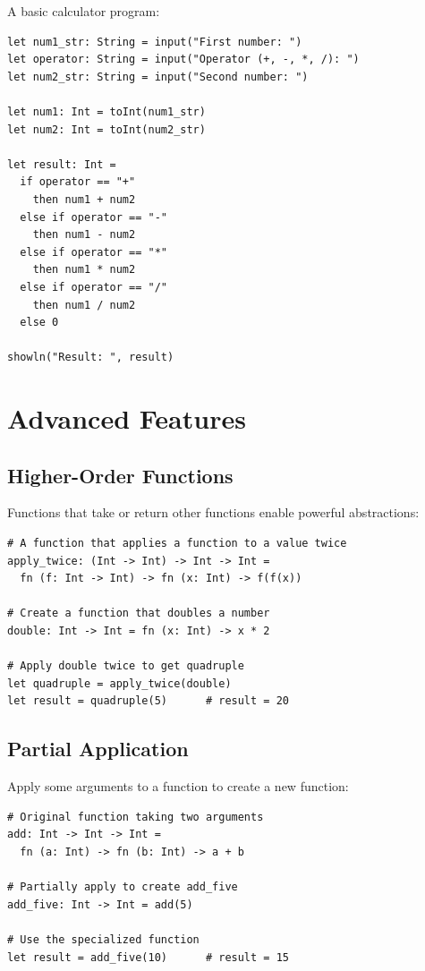 \documentclass[11pt,twoside,openright]{book}
\begin{document}
A basic calculator program:

\begin{lstlisting}[language=ConstructLang]
let num1_str: String = input("First number: ")
let operator: String = input("Operator (+, -, *, /): ")
let num2_str: String = input("Second number: ")

let num1: Int = toInt(num1_str)
let num2: Int = toInt(num2_str)

let result: Int =
  if operator == "+"
    then num1 + num2
  else if operator == "-"
    then num1 - num2
  else if operator == "*"
    then num1 * num2
  else if operator == "/"
    then num1 / num2
  else 0

showln("Result: ", result)
\end{lstlisting}

\chapter{Advanced Features}

\section{Higher-Order Functions}

Functions that take or return other functions enable powerful abstractions:

\begin{lstlisting}[language=ConstructLang]
# A function that applies a function to a value twice
apply_twice: (Int -> Int) -> Int -> Int =
  fn (f: Int -> Int) -> fn (x: Int) -> f(f(x))

# Create a function that doubles a number
double: Int -> Int = fn (x: Int) -> x * 2

# Apply double twice to get quadruple
let quadruple = apply_twice(double)
let result = quadruple(5)      # result = 20
\end{lstlisting}

\section{Partial Application}

Apply some arguments to a function to create a new function:

\begin{lstlisting}[language=ConstructLang]
# Original function taking two arguments
add: Int -> Int -> Int =
  fn (a: Int) -> fn (b: Int) -> a + b

# Partially apply to create add_five
add_five: Int -> Int = add(5)

# Use the specialized function
let result = add_five(10)      # result = 15
\end{lstlisting}
\end{document}
